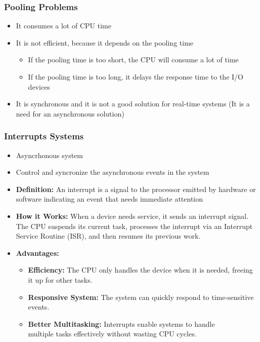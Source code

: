 
\begin{frame}
    \frametitle{Pooling Problems}
    \begin{itemize}
        \item It consumes a lot of CPU time
        \item It is not efficient, because it depends on the pooling time
        \begin{itemize}
            \item If the pooling time is too short, the CPU will consume a lot of time
            \item If the pooling time is too long, it delays the response time to the I/O devices
        \end{itemize}

        \item It is synchronous and it is not a good solution for real-time systems (It is a need for an asynchronous solution)

    \end{itemize}
\end{frame}

\begin{frame}
    \frametitle{Interrupts Systems}
    \begin{itemize}
        \item Asyncrhonous system
        \item Control and syncronize the asynchronous events in the system
        \item \textbf{Definition:} An interrupt is a signal to the processor emitted by hardware or software indicating an event that needs immediate attention
        \item \textbf{How it Works:} When a device needs service, it sends an interrupt signal. The CPU suspends its current task, processes the interrupt via an Interrupt Service Routine (ISR), and then resumes its previous work.
        \item \textbf{Advantages:}
        \begin{itemize}
            \item \textbf{Efficiency:} The CPU only handles the device when it is needed, freeing it up for other tasks.
            \item \textbf{Responsive System:} The system can quickly respond to time-sensitive events.

            \item \textbf{Better Multitasking:} Interrupts enable systems to handle \\ multiple tasks effectively without wasting CPU cycles.

        \end{itemize}
    \end{itemize}
\end{frame}

